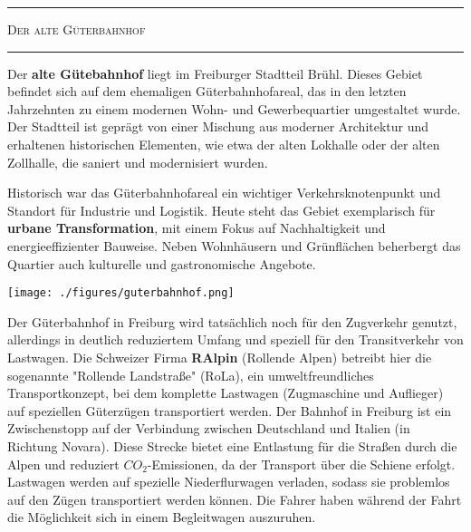 \documentclass[landscape, a4paper]{article}
\newcommand\alert[1]{\textcolor{PrimaryColor}{\textbf{#1}}}
\begin{document}
\centering
\footnotesize
\noindent%
\begin{minipage}[t]{0.31\textwidth}
	\vspace{0cm}
	\setlength{\parskip}{0.25cm}
	\vspace{0.5cm}
	\textcolor{PrimaryColor}{
		\rule{\linewidth}{0.5mm}
		\vspace{-0.1cm}
		\begin{center}
			\large
			\textsc{Der alte Güterbahnhof}
		\end{center}
		\rule{\linewidth}{0.5mm}
	}

	Der \alert{alte Gütebahnhof} liegt im Freiburger Stadtteil Brühl. Dieses Gebiet befindet sich auf dem ehemaligen Güterbahnhofareal, das in den letzten Jahrzehnten zu einem modernen Wohn- und Gewerbequartier umgestaltet wurde. Der Stadtteil ist geprägt von einer Mischung aus moderner Architektur und erhaltenen historischen Elementen, wie etwa der alten Lokhalle oder der alten Zollhalle, die saniert und modernisiert wurden.

	Historisch war das Güterbahnhofareal ein wichtiger Verkehrsknotenpunkt und Standort für Industrie und Logistik. Heute steht das Gebiet exemplarisch für \alert{urbane Transformation}, mit einem Fokus auf Nachhaltigkeit und energieeffizienter Bauweise. Neben Wohnhäusern und Grünflächen beherbergt das Quartier auch kulturelle und gastronomische Angebote.%

	\texttt{[image: ./figures/guterbahnhof.png]}
	\setlength{\parskip}{0.25cm}

	Der Güterbahnhof in Freiburg wird tatsächlich noch für den Zugverkehr genutzt, allerdings in deutlich reduziertem Umfang und speziell für den Transitverkehr von Lastwagen. Die Schweizer Firma \alert{RAlpin} (Rollende Alpen) betreibt hier die sogenannte "Rollende Landstraße" (RoLa), ein umweltfreundliches Transportkonzept, bei dem komplette Lastwagen (Zugmaschine und Auflieger) auf speziellen Güterzügen transportiert werden. Der Bahnhof in Freiburg ist ein Zwischenstopp auf der Verbindung zwischen Deutschland und Italien (in Richtung Novara). Diese Strecke bietet eine Entlastung für die Straßen durch die Alpen und reduziert $CO_2$-Emissionen, da der Transport über die Schiene erfolgt. Lastwagen werden auf spezielle Niederflurwagen verladen, sodass sie problemlos auf den Zügen transportiert werden können. Die Fahrer haben während der Fahrt die Möglichkeit sich in einem Begleitwagen auszuruhen.

\end{minipage}%
\end{document}
